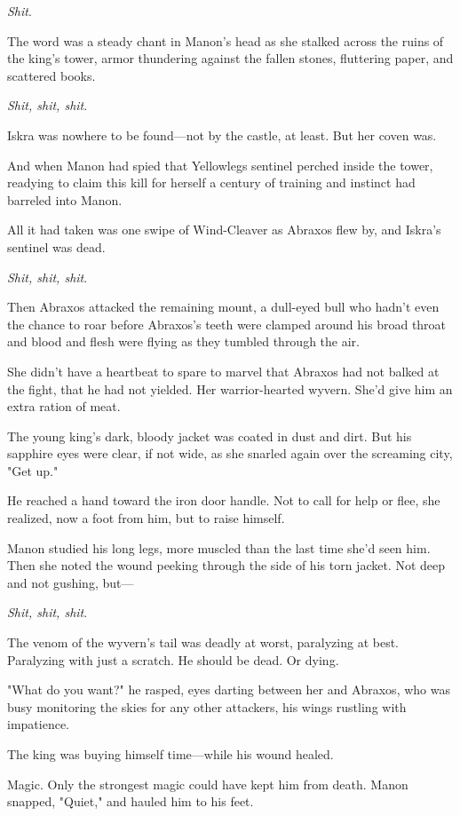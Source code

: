 \emph{Shit}.

The word was a steady chant in Manon's head as she stalked across the ruins of the king's tower, armor thundering against the fallen stones, fluttering paper, and scattered books.

\emph{Shit, shit, shit}.

Iskra was nowhere to be found---not by the castle, at least. But her coven was.

And when Manon had spied that Yellowlegs sentinel perched inside the tower, readying to claim this kill for herself  a century of training and instinct had barreled into Manon.

All it had taken was one swipe of Wind-Cleaver as Abraxos flew by, and Iskra's sentinel was dead.

\emph{Shit, shit, shit}.

Then Abraxos attacked the remaining mount, a dull-eyed bull who hadn't even the chance to roar before Abraxos's teeth were clamped around his broad throat and blood and flesh were flying as they tumbled through the air.

She didn't have a heartbeat to spare to marvel that Abraxos had not balked at the fight, that he had not yielded. Her warrior-hearted wyvern. She'd give him an extra ration of meat.

The young king's dark, bloody jacket was coated in dust and dirt. But his sapphire eyes were clear, if not wide, as she snarled again over the screaming city, "Get up."

He reached a hand toward the iron door handle. Not to call for help or flee, she realized, now a foot from him, but to raise himself.

Manon studied his long legs, more muscled than the last time she'd seen him. Then she noted the wound peeking through the side of his torn jacket. Not deep and not gushing, but---

\emph{Shit, shit, shit}.

The venom of the wyvern's tail was deadly at worst, paralyzing at best. Paralyzing with just a scratch. He should be dead. Or dying.

"What do you want?" he rasped, eyes darting between her and Abraxos, who was busy monitoring the skies for any other attackers, his wings rustling with impatience.

The king was buying himself time---while his wound healed.

Magic. Only the strongest magic could have kept him from death. Manon snapped, "Quiet," and hauled him to his feet.

